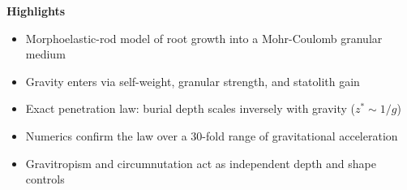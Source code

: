 \documentclass[11pt]{article}
\begin{document}
{\Large\textbf{Highlights}}\par
\vspace{1em}

\begin{itemize}
  \item Morphoelastic-rod model of root growth into a Mohr-Coulomb granular medium
  \item Gravity enters via self-weight, granular strength, and statolith gain
  \item Exact penetration law: burial depth scales inversely with gravity ($z^{*}\sim 1/g$)
  \item Numerics confirm the law over a 30-fold range of gravitational acceleration
  \item Gravitropism and circumnutation act as independent depth and shape controls
\end{itemize}
\end{document}
